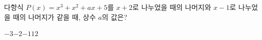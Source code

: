 다항식 $P(x)=x^3+x^2+ax+5$를 $x+2$로 나누었을 때의 나머지와 $x-1$로 나누었을 때의 나머지가 같을 때, 상수 $a$의 값은?
\begin{choices32}{$-3$}{$-2$}{$-1$}{$1$}{$2$}\end{choices32}
